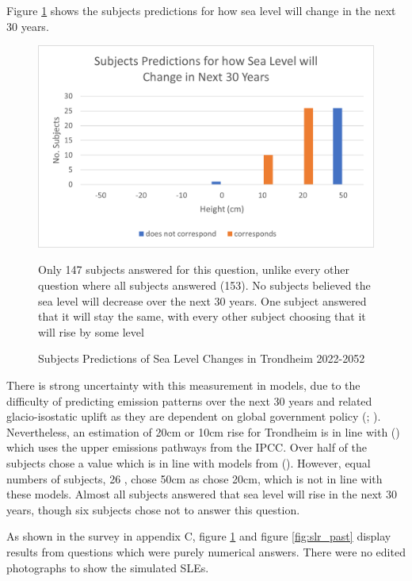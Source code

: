 Figure \ref{fig:slr_future} shows the subjects predictions for how sea level will change in the next 30 years. 

\begin{figure}[H]
    \centering
    \includegraphics{fig_results/slr-future.png}
    \caption{Subjects Predictions of Sea Level Changes in Trondheim 2022-2052}{Only 147 subjects answered for this question, unlike every other question where all subjects answered (153). No subjects believed the sea level will decrease over the next 30 years. One subject answered that it will stay the same, with every other subject choosing that it will rise by some level }
    \label{fig:slr_future}
\end{figure}

There is strong uncertainty with this measurement in models, due to the difficulty of predicting emission patterns over the next 30 years and related glacio-isostatic uplift as they are dependent on global government policy (\cite{hanssen-bauer_climate_2017}; \cite{kartverket_se_2021}). Nevertheless, an estimation of 20cm or 10cm rise for Trondheim is in line with (\cite{kartverket_se_2021}) which uses the upper emissions pathways from the IPCC. Over half of the subjects chose a value which is in line with models from (\cite{kartverket_se_2021}). However, equal numbers of subjects, 26 , chose 50cm as chose 20cm,  which is not in line with these models. Almost all subjects answered that sea level will rise in the next 30 years, though six subjects chose not to answer this question.  

As shown in the survey in appendix C, figure \ref{fig:slr_future} and figure \ref{fig:slr_past} display results from questions which were purely numerical answers. There were no edited photographs to show the simulated SLEs.
\paragraph{}



